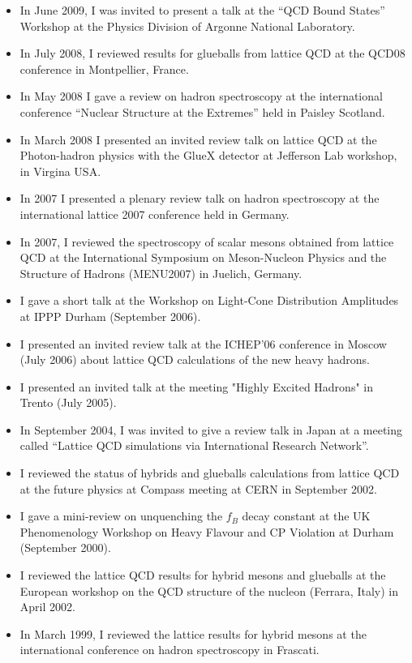 \documentclass[12pt]{article}
\begin{document}
\begin{itemize}
\item In June 2009, I was invited to present a talk at 
      the ``QCD Bound States'' Workshop at
the Physics Division of Argonne National Laboratory.


\item In July 2008, I reviewed results 
      for glueballs from lattice QCD at the QCD08 conference
      in Montpellier, France.

\item In May 2008 I gave a review on
hadron spectroscopy at the international conference 
``Nuclear Structure at the Extremes'' held in Paisley Scotland.

\item In March
2008 I presented an invited review talk on lattice QCD at the
Photon-hadron physics with the GlueX detector at Jefferson Lab
workshop, in Virgina USA. 

\item In 2007 I presented a plenary review talk on hadron spectroscopy 
      at the international lattice 2007 conference held in
      Germany. 

\item  In
2007, I reviewed the spectroscopy of scalar mesons obtained from
lattice QCD at the International Symposium on Meson-Nucleon Physics
and the Structure of Hadrons (MENU2007) in Juelich, Germany.  

\item I gave a short talk at the Workshop on
Light-Cone Distribution Amplitudes at IPPP Durham (September 2006).

\item I presented an invited review talk at the ICHEP'06 conference
in Moscow (July 2006) about lattice QCD calculations of the 
new heavy hadrons.

\item I presented an
     invited talk at the meeting "Highly Excited Hadrons" in Trento (July
      2005). 

\item In September 2004, I was
invited to give a review talk in Japan at a meeting called ``Lattice
QCD simulations via International Research Network''.  

\item I reviewed the status of hybrids
and glueballs calculations from lattice QCD at the future physics at
Compass meeting at CERN in September 2002.  

\item I gave a mini-review on unquenching the $f_B$
decay constant at the UK Phenomenology Workshop on Heavy Flavour and
CP Violation at Durham (September 2000). 

\item I
reviewed the lattice QCD results for hybrid mesons and glueballs at
the European workshop on the QCD structure of the nucleon (Ferrara,
Italy) in April 2002.  

\item In March 1999, I reviewed the lattice results for hybrid mesons at the
international conference on hadron spectroscopy in Frascati.  

\end{itemize}
\end{document}
